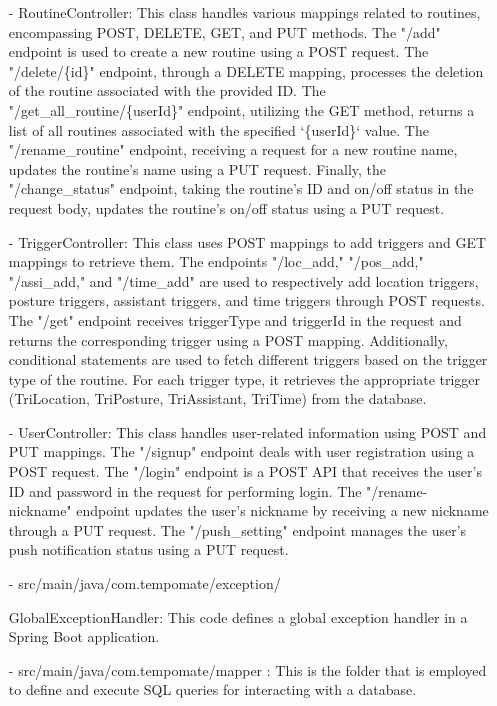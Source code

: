 \begin{enumerate}
    \item[-] RoutineController: This class handles various mappings related to routines, encompassing POST, DELETE, GET, and PUT methods. The "/add" endpoint is used to create a new routine using a POST request. The "/delete/\{id\}" endpoint, through a DELETE mapping, processes the deletion of the routine associated with the provided ID. The "/get\_all\_routine/\{userId\}" endpoint, utilizing the GET method, returns a list of all routines associated with the specified `\{userId\}` value. The "/rename\_routine" endpoint, receiving a request for a new routine name, updates the routine's name using a PUT request. Finally, the "/change\_status" endpoint, taking the routine's ID and on/off status in the request body, updates the routine's on/off status using a PUT request. \\
    \item[-] TriggerController: This class uses POST mappings to add triggers and GET mappings to retrieve them. The endpoints "/loc\_add," "/pos\_add," "/assi\_add," and "/time\_add" are used to respectively add location triggers, posture triggers, assistant triggers, and time triggers through POST requests. The "/get" endpoint receives triggerType and triggerId in the request and returns the corresponding trigger using a POST mapping. Additionally, conditional statements are used to fetch different triggers based on the trigger type of the routine. For each trigger type, it retrieves the appropriate trigger (TriLocation, TriPosture, TriAssistant, TriTime) from the database. \\
    \item[-] UserController: This class handles user-related information using POST and PUT mappings. The "/signup" endpoint deals with user registration using a POST request. The "/login" endpoint is a POST API that receives the user's ID and password in the request for performing login. The "/rename-nickname" endpoint updates the user's nickname by receiving a new nickname through a PUT request. The "/push\_setting" endpoint manages the user's push notification status using a PUT request.\\
    \item[-] src/main/java/com.tempomate/exception/ \par GlobalExceptionHandler: This code defines a global exception handler in a Spring Boot application.\\
    \item[-] src/main/java/com.tempomate/mapper : This is the folder that is employed to define and execute SQL queries for interacting with a database. \\

\end{enumerate}
